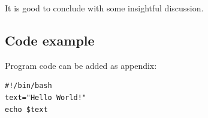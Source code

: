 \documentclass[english,twoside,openright]{HYgraduMLDS}
\begin{document}
It is good to conclude with some insightful discussion. 


\cleardoublepage %



\begin{appendices}
\myappendixtitle

\chapter{Code example\label{appendix:code}}
Program code can be added as appendix:
\begin{verbatim}
#!/bin/bash          
text="Hello World!"
echo $text
\end{verbatim}

\end{appendices}
\end{document}
